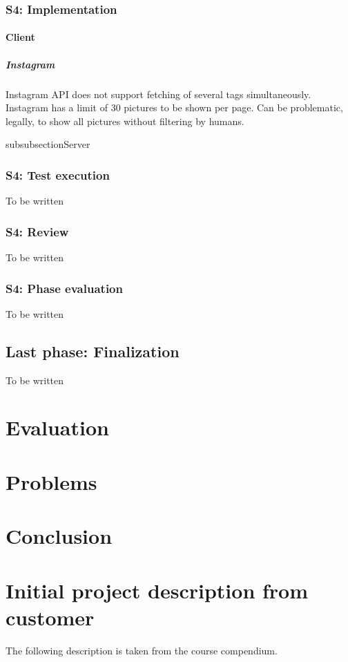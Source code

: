 \documentclass[11pt]{book}
\begin{document}
\subsection{S4: Implementation}

\subsubsection{Client}
\paragraph{Instagram}
Instagram API does not support fetching of several tags simultaneously.
Instagram has a limit of 30 pictures to be shown per page. 
Can be problematic, legally, to show all pictures without filtering by humans.

subsubsection{Server}

\subsection{S4: Test execution}
To be written
\subsection{S4: Review}
To be written
\subsection{S4: Phase evaluation}
To be written

\section{Last phase: Finalization}
To be written

\chapter{Evaluation}

\chapter{Problems}

\chapter{Conclusion}



\appendix
\chapter{Initial project description from customer}
The following description is taken from the course compendium\cite[p. 47]{compendium}.
\end{document}
